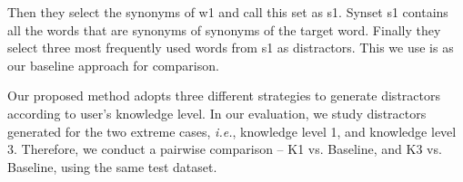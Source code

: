 Then they select the synonyms of w1 and call this set as s1.
Synset s1 contains all the words that are synonyms of synonyms of the target word. Finally they select three most frequently used words from s1 as distractors. This we use is as our baseline approach for comparison.

Our proposed method adopts three different strategies to generate distractors according to user's knowledge level. In our evaluation, we study distractors generated for the two extreme cases, {\it i.e.}, knowledge level 1, and knowledge level 3. Therefore, we conduct a pairwise comparison -- K1  vs. Baseline, and K3  vs. Baseline, using the same test dataset.

%






